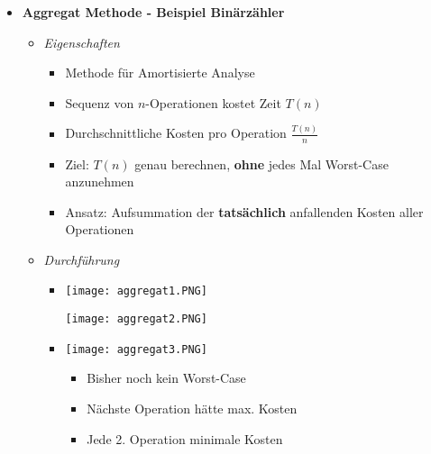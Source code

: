 \begin{itemize}
        \item \textbf{Aggregat Methode - Beispiel Binärzähler}
            \begin{itemize}
                \item \textit{Eigenschaften}
                    \begin{itemize}
                        \item Methode für Amortisierte Analyse
                        \item Sequenz von $n$-Operationen kostet Zeit $T(n)$
                        \item Durchschnittliche Kosten pro Operation $\frac{T(n)}{n}$
                        \item Ziel: $T(n)$ genau berechnen, \textbf{ohne} jedes Mal Worst-Case anzunehmen
                        \item Ansatz: Aufsummation der \textbf{tatsächlich} anfallenden Kosten aller Operationen
                    \end{itemize}
                \item \textit{Durchführung}
                    \begin{itemize}
                        \item[]
                            \begin{minipage}{0.4\textwidth}
                                \texttt{[image: aggregat1.PNG]}
                            \end{minipage}
                            \begin{minipage}{0.5\textwidth}
                                \texttt{[image: aggregat2.PNG]}
                            \end{minipage}
                        \item[]
                            \begin{minipage}{0.4\textwidth}
                                \texttt{[image: aggregat3.PNG]}
                            \end{minipage}
                            \begin{minipage}{0.5\textwidth}
                                \begin{itemize}
                                    \item Bisher noch kein Worst-Case
                                    \item Nächste Operation hätte max. Kosten
                                    \item Jede 2. Operation minimale Kosten

\end{itemize}
\end{minipage}
\end{itemize}
\end{itemize}
\end{itemize}
